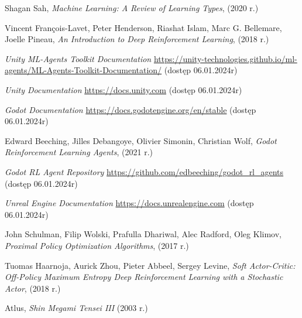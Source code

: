 \documentclass{SGGW-thesis}
\begin{document}
\begin{thebibliography}{9}
  Shagan Sah,
  \textit{Machine Learning: A Review of Learning Types},
  (2020 r.)

  Vincent François-Lavet, Peter Henderson, Riashat Islam, Marc G. Bellemare, Joelle Pineau,
  \textit{An Introduction to Deep Reinforcement Learning},
  (2018 r.)

  \textit{Unity ML-Agents Toolkit Documentation} 
  \url{https://unity-technologies.github.io/ml-agents/ML-Agents-Toolkit-Documentation/}
  (dostęp 06.01.2024r)

  \textit{Unity Documentation}
  \url{https://docs.unity.com}
  (dostęp 06.01.2024r)

  \textit{Godot Documentation}
  \url{https://docs.godotengine.org/en/stable}
  (dostęp 06.01.2024r)

  Edward Beeching, Jilles Debangoye, Olivier Simonin, Christian Wolf,
  \textit{Godot Reinforcement Learning Agents},
  (2021 r.)

  \textit{Godot RL Agent Repository}
  \url{https://github.com/edbeeching/godot_rl_agents}
  (dostęp 06.01.2024r)

  \textit{Unreal Engine Documentation}
  \url{https://docs.unrealengine.com}
  (dostęp 06.01.2024r)
  
  John Schulman, Filip Wolski, Prafulla Dhariwal, Alec Radford, Oleg Klimov, 
  \textit{Proximal Policy Optimization Algorithms},
  (2017 r.)

  Tuomas Haarnoja, Aurick Zhou, Pieter Abbeel, Sergey Levine, 
  \textit{Soft Actor-Critic: Off-Policy Maximum Entropy Deep Reinforcement Learning with a Stochastic Actor},
  (2018 r.)

  Atlus,
  \textit{Shin Megami Tensei III}
  (2003 r.)
\end{thebibliography}

\beforelastpage
\end{document}
